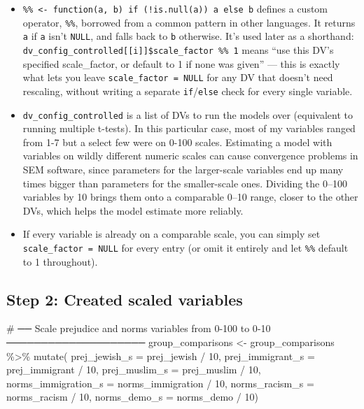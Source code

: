 \documentclass[
  letterpaper,
  DIV=11,
  numbers=noendperiod]{scrreprt}
\newenvironment{Shaded}{\begin{snugshade}}{\end{snugshade}}
\newcommand{\AttributeTok}[1]{\textcolor[rgb]{0.40,0.45,0.13}{#1}}
\newcommand{\CommentTok}[1]{\textcolor[rgb]{0.37,0.37,0.37}{#1}}
\newcommand{\DecValTok}[1]{\textcolor[rgb]{0.68,0.00,0.00}{#1}}
\newcommand{\FunctionTok}[1]{\textcolor[rgb]{0.28,0.35,0.67}{#1}}
\newcommand{\NormalTok}[1]{\textcolor[rgb]{0.00,0.23,0.31}{#1}}
\newcommand{\OtherTok}[1]{\textcolor[rgb]{0.00,0.23,0.31}{#1}}
\newcommand{\SpecialCharTok}[1]{\textcolor[rgb]{0.37,0.37,0.37}{#1}}
\begin{document}
\begin{itemize}
\item
  \texttt{\%\textbar{}\textbar{}\%\ \textless{}-\ function(a,\ b)\ if\ (!is.null(a))\ a\ else\ b}
  defines a custom operator, \texttt{\%\textbar{}\textbar{}\%}, borrowed
  from a common pattern in other languages. It returns \texttt{a} if
  \texttt{a} isn't \texttt{NULL}, and falls back to \texttt{b}
  otherwise. It's used later as a shorthand:
  \texttt{dv\_config\_controlled{[}{[}i{]}{]}\$scale\_factor\ \%\textbar{}\textbar{}\%\ 1}
  means ``use this DV's specified scale\_factor, or default to 1 if none
  was given'' --- this is exactly what lets you leave
  \texttt{scale\_factor\ =\ NULL} for any DV that doesn't need
  rescaling, without writing a separate \texttt{if}/\texttt{else} check
  for every single variable.
\item
  \texttt{dv\_config\_controlled} is a list of DVs to run the models
  over (equivalent to running multiple t-tests). In this particular
  case, most of my variables ranged from 1-7 but a select few were on
  0-100 scales. Estimating a model with variables on wildly different
  numeric scales can cause convergence problems in SEM software, since
  parameters for the larger-scale variables end up many times bigger
  than parameters for the smaller-scale ones. Dividing the 0--100
  variables by 10 brings them onto a comparable 0--10 range, closer to
  the other DVs, which helps the model estimate more reliably.
\item
  If every variable is already on a comparable scale, you can simply set
  \texttt{scale\_factor\ =\ NULL} for every entry (or omit it entirely
  and let \texttt{\%\textbar{}\textbar{}\%} default to 1 throughout).
\end{itemize}

\subsection{Step 2: Created scaled
variables}\label{step-2-created-scaled-variables}

\begin{Shaded}
\begin{Highlighting}[]
\CommentTok{\# ── Scale prejudice and norms variables from 0{-}100 to 0{-}10 ────────────────────}
\NormalTok{group\_comparisons }\OtherTok{\textless{}{-}}\NormalTok{ group\_comparisons }\SpecialCharTok{\%\textgreater{}\%}
  \FunctionTok{mutate}\NormalTok{(}
    \AttributeTok{prej\_jewish\_s        =}\NormalTok{ prej\_jewish }\SpecialCharTok{/} \DecValTok{10}\NormalTok{,}
    \AttributeTok{prej\_immigrant\_s     =}\NormalTok{ prej\_immigrant }\SpecialCharTok{/} \DecValTok{10}\NormalTok{,}
    \AttributeTok{prej\_muslim\_s        =}\NormalTok{ prej\_muslim }\SpecialCharTok{/} \DecValTok{10}\NormalTok{,}
    \AttributeTok{norms\_immigration\_s  =}\NormalTok{ norms\_immigration }\SpecialCharTok{/} \DecValTok{10}\NormalTok{,}
    \AttributeTok{norms\_racism\_s       =}\NormalTok{ norms\_racism }\SpecialCharTok{/} \DecValTok{10}\NormalTok{,}
    \AttributeTok{norms\_demo\_s         =}\NormalTok{ norms\_demo }\SpecialCharTok{/} \DecValTok{10}\NormalTok{)}
\end{Highlighting}
\end{Shaded}
\end{document}
